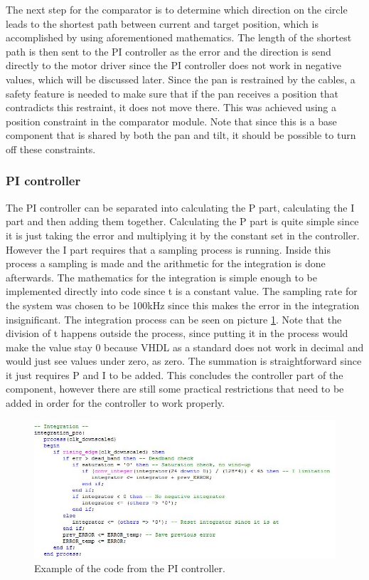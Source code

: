 The next step for the comparator is to determine which direction on the circle leads to the shortest path between current and target position, which is accomplished by using aforementioned mathematics. The length of the shortest path is then sent to the PI controller as the error and the direction is send directly to the motor driver since the PI controller does not work in negative values, which will be discussed later.
Since the pan is restrained by the cables, a safety feature is needed to make sure that if the pan receives a position that contradicts this restraint, it does not move there. This was achieved using a position constraint in the comparator module. Note that since this is a base component that is shared by both the pan and tilt, it should be possible to turn off these constraints.



\subsubsection{PI controller}

The PI controller can be separated into calculating the P part, calculating the I part and then adding them together. Calculating the P part is quite simple since it is just taking the error and multiplying it by the constant set in the controller. However the I part requires that a sampling process is running. Inside this process a sampling is made and the arithmetic for the integration is done afterwards. The mathematics for the integration is simple enough to be implemented directly into code since t is a constant value. The sampling rate for the system was chosen to be 100kHz since this makes the error in the integration insignificant. The integration process can be seen on picture \ref{fig:PI controller code example}. Note that the division of t happens outside the process, since putting it in the process would make the value stay 0 because VHDL as a standard does not work in decimal and would just see values under zero, as zero. The summation is straightforward since it just requires P and I to be added. This concludes the controller part of the component, however there are still some practical restrictions that need to be added in order for the controller to work properly.


\begin{figure}[h!]
\centering
\includegraphics[scale=0.7]{Billeder/FPGA/PI_controller_code_example.jpg}
\caption{Example of the code from the PI controller.}
\label{fig:PI controller code example}
\end{figure}


